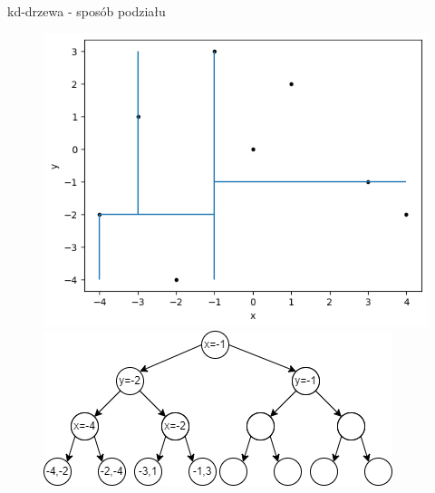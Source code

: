 \documentclass[aspectratio=169,dvipsnames]{beamer}
\begin{document}
\begin{frame}{kd-drzewa - sposób podziału}
    \begin{figure}[H]
        \centering
          \begin{minipage}{0.5\textwidth}
            \centering
            \includegraphics[width=\linewidth]{images/plots/6.png}
          \end{minipage}%
          \begin{minipage}{0.5\textwidth}
            \centering
            \includegraphics[width=\linewidth]{images/trees/8.drawio.png}
          \end{minipage}
    \end{figure}
\end{frame}
\end{document}
